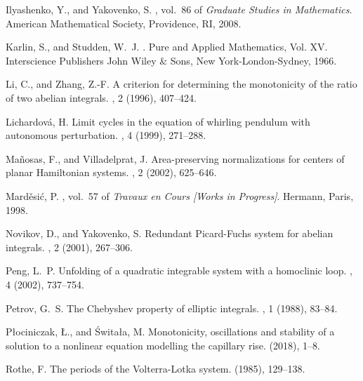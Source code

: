 \documentclass[12pt,a4paper,reqno]{amsart}
\begin{document}
\begin{thebibliography}{10}
{\sc Ilyashenko, Y., and Yakovenko, S.}
, vol.~86 of {\em
  Graduate Studies in Mathematics}.
\newblock American Mathematical Society, Providence, RI, 2008.

{\sc Karlin, S., and Studden, W.~J.}
.
\newblock Pure and Applied Mathematics, Vol. XV. Interscience Publishers John
  Wiley \& Sons, New York-London-Sydney, 1966.

{\sc Li, C., and Zhang, Z.-F.}
\newblock A criterion for determining the monotonicity of the ratio of two
  abelian integrals.
, 2 (1996), 407--424.

{\sc Lichardov\'{a}, H.}
\newblock Limit cycles in the equation of whirling pendulum with autonomous
  perturbation.
, 4 (1999), 271--288.

{\sc Ma\~{n}osas, F., and Villadelprat, J.}
\newblock Area-preserving normalizations for centers of planar {H}amiltonian
  systems.
, 2 (2002), 625--646.

{\sc Mard\v{e}si\'{c}, P.}
, vol.~57 of {\em Travaux en Cours [Works in Progress]}.
\newblock Hermann, Paris, 1998.

{\sc Novikov, D., and Yakovenko, S.}
\newblock Redundant {P}icard-{F}uchs system for abelian integrals.
, 2 (2001), 267--306.

{\sc Peng, L.~P.}
\newblock Unfolding of a quadratic integrable system with a homoclinic loop.
, 4 (2002), 737--754.

{\sc Petrov, G.~S.}
\newblock The {C}hebyshev property of elliptic integrals.
, 1 (1988), 83--84.

{\sc P\l ociniczak, \L., and \'{S}wita\l a, M.}
\newblock Monotonicity, oscillations and stability of a solution to a nonlinear
  equation modelling the capillary rise.
 (2018), 1--8.

{\sc Rothe, F.}
\newblock The periods of the {V}olterra-{L}otka system.
 (1985), 129--138.


\end{thebibliography}
\end{document}
